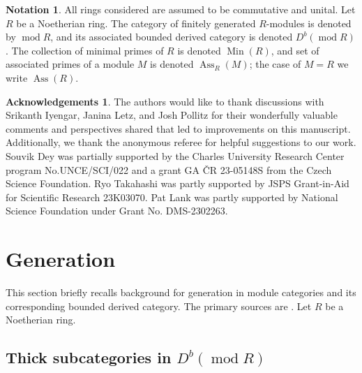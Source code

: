 \documentclass[11pt]{amsart}
\theoremstyle{plain}
\theoremstyle{definition}
\newtheorem*{ack}{Acknowledgements}
\newtheorem*{notation}{Notation}
\numberwithin{equation}{section}
\numberwithin{theorem}{section}
\begin{document}
\begin{notation}
    All rings considered are assumed to be commutative and unital. Let $R$ be a Noetherian ring. The category of finitely generated $R$-modules is denoted by $\operatorname{mod}R$, and its associated bounded derived category is denoted $D^b (\operatorname{mod}R)$. The collection of minimal primes of $R$ is denoted $\operatorname{Min}(R)$, and set of associated primes of a module $M$ is denoted $\operatorname{Ass}_R(M)$; the case of $M=R$ we write $\operatorname{Ass}(R)$.
\end{notation}

\begin{ack}
    The authors would like to thank discussions with Srikanth Iyengar,
    Janina Letz, and Josh Pollitz for their wonderfully valuable comments and
    perspectives shared that led to improvements on this manuscript. Additionally, we thank the anonymous referee for helpful suggestions to our work. Souvik Dey
    was partially supported by the Charles University Research Center program
    No.UNCE/SCI/022 and a grant GA \v{C}R 23-05148S from the Czech Science
    Foundation. Ryo Takahashi was partly supported by JSPS Grant-in-Aid for
    Scientific Research 23K03070. Pat Lank was partly supported by National
    Science Foundation under Grant No. DMS-2302263.
\end{ack}

\section{Generation}
\label{sec:generation}

This section briefly recalls background for generation in module categories and its corresponding bounded derived category. The primary sources are \cite{Bondal/VandenBergh:2003, Iyengar/Takahashi:2016, Avramov/Buchweitz/Iyengar/Miller:2010}. Let $R$ be a Noetherian ring.

\subsection{Thick subcategories in \texorpdfstring{$D^b(\operatorname{mod}R)$}{t}}
\label{sec:thick_subcategories_derived_category}
\end{document}
